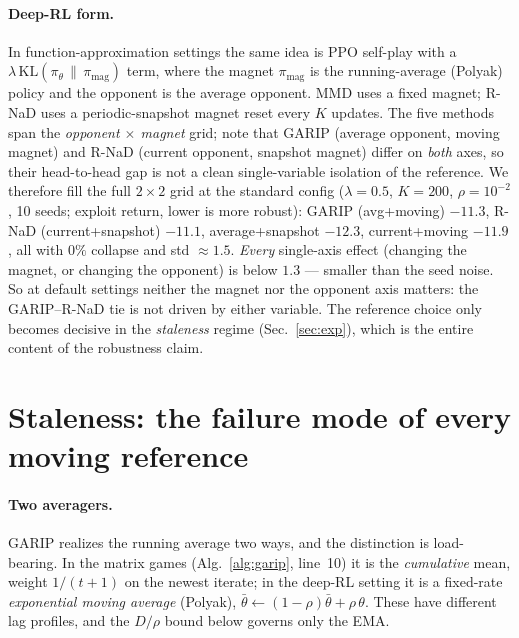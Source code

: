 \documentclass[10pt,twocolumn]{article}
\theoremstyle{plain}
\theoremstyle{remark}
\newcommand{\KL}{\mathrm{KL}}
\begin{document}
\paragraph{Deep-RL form.} In function-approximation settings the same idea is
PPO self-play with a $\lambda\,\KL(\pi_\theta \,\|\, \pi_{\text{mag}})$ term,
where the magnet $\pi_{\text{mag}}$ is the running-average (Polyak) policy and
the opponent is the average opponent. MMD uses a fixed magnet; R-NaD uses a
periodic-snapshot magnet reset every $K$ updates. The five methods span the
\emph{opponent $\times$ magnet} grid; note that GARIP (average opponent, moving
magnet) and R-NaD (current opponent, snapshot magnet) differ on \emph{both} axes,
so their head-to-head gap is not a clean single-variable isolation of the
reference. We therefore fill the full $2\times2$ grid at the standard config
($\lambda\!=\!0.5$, $K\!=\!200$, $\rho\!=\!10^{-2}$, 10 seeds; exploit return,
lower is more robust): GARIP (avg+moving) $-11.3$, R-NaD (current+snapshot)
$-11.1$, average+snapshot $-12.3$, current+moving $-11.9$, all with $0\%$
collapse and std $\approx\!1.5$. \emph{Every} single-axis effect (changing the
magnet, or changing the opponent) is below $1.3$ --- smaller than the seed noise.
So at default settings neither the magnet nor the opponent axis matters: the
GARIP--R-NaD tie is not driven by either variable. The reference choice only
becomes decisive in the \emph{staleness} regime (Sec.~\ref{sec:exp}), which is
the entire content of the robustness claim.

\section{Staleness: the failure mode of every moving reference}
\label{sec:theory}

\paragraph{Two averagers.} GARIP realizes the running average two ways, and the
distinction is load-bearing. In the matrix games (Alg.~\ref{alg:garip}, line~10)
it is the \emph{cumulative} mean, weight $1/(t{+}1)$ on the newest iterate; in
the deep-RL setting it is a fixed-rate \emph{exponential moving average} (Polyak),
$\bar\theta \leftarrow (1{-}\rho)\bar\theta + \rho\,\theta$. These have different
lag profiles, and the $D/\rho$ bound below governs only the EMA.
\end{document}
